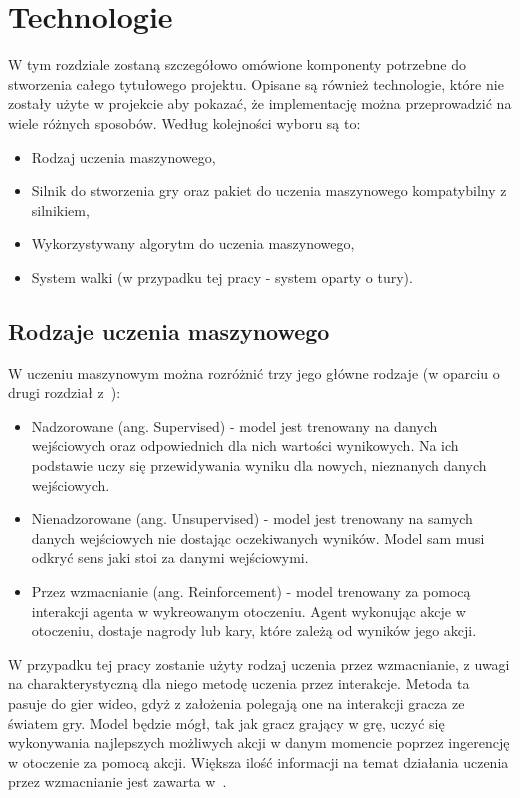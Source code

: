 \documentclass{SGGW-thesis}
\begin{document}
\chapter{Technologie}
W tym rozdziale zostaną szczegółowo omówione komponenty potrzebne do stworzenia całego tytułowego projektu. Opisane są również technologie, które nie zostały użyte w projekcie aby pokazać, że implementację można przeprowadzić na wiele różnych sposobów. Według kolejności wyboru są to: 
\begin{itemize}
  \item{Rodzaj uczenia maszynowego},
  \item{Silnik do stworzenia gry oraz pakiet do uczenia maszynowego kompatybilny z silnikiem},
  \item{Wykorzystywany algorytm do uczenia maszynowego},
  \item{System walki (w przypadku tej pracy - system oparty o tury)}.
\end{itemize}


\section{Rodzaje uczenia maszynowego}
W uczeniu maszynowym można rozróżnić trzy jego główne rodzaje (w oparciu o drugi rozdział z~\cite{MachineLearningTypes}):
\begin{itemize}
  \item{Nadzorowane (ang. Supervised) - model jest trenowany na danych wejściowych oraz odpowiednich dla nich wartości wynikowych. Na ich podstawie uczy się przewidywania wyniku dla nowych, nieznanych danych wejściowych.}
  \item{Nienadzorowane (ang. Unsupervised) - model jest trenowany na samych danych wejściowych nie dostając oczekiwanych wyników. Model sam musi odkryć sens jaki stoi za danymi wejściowymi.}
  \item{Przez wzmacnianie (ang. Reinforcement) - model trenowany za pomocą interakcji agenta w wykreowanym otoczeniu. Agent wykonując akcje w otoczeniu, dostaje nagrody lub kary, które zależą od wyników jego akcji.}
\end{itemize}
W przypadku tej pracy zostanie użyty rodzaj uczenia przez wzmacnianie, z uwagi na charakterystyczną dla niego metodę uczenia przez interakcje. 
Metoda ta pasuje do gier wideo, gdyż z założenia polegają one na interakcji gracza ze światem gry. Model będzie mógł, tak jak gracz grający w grę, uczyć się wykonywania najlepszych możliwych akcji w danym momencie poprzez ingerencję w otoczenie za pomocą akcji. Większa ilość informacji na temat 
działania uczenia przez wzmacnianie jest zawarta w~\cite{ReinforcementLearning}.
\end{document}
